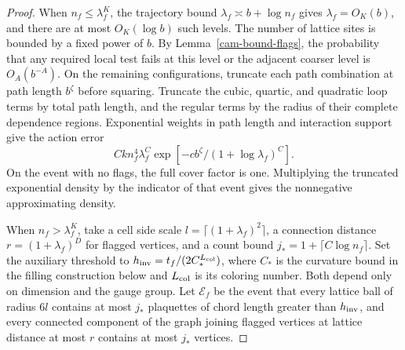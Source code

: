\documentclass[11pt,a4paper]{article}
\numberwithin{equation}{section}
\begin{document}
\begin{proof}
When \(n_f\le\lambda_f^K\), the trajectory bound \(\lambda_f\asymp b+\log n_f\) gives \(\lambda_f=O_K(b)\), and there are at most \(O_K(\log b)\) such levels. The number of lattice sites is bounded by a fixed power of \(b\). By Lemma~\ref{cam-bound-flags}, the probability that any required local test fails at this level or the adjacent coarser level is \(O_A(b^{-A})\). On the remaining configurations, truncate each path combination at path length \(b^\zeta\) before squaring. Truncate the cubic, quartic, and quadratic loop terms by total path length, and the regular terms by the radius of their complete dependence regions. Exponential weights in path length and interaction support give the action error \cite[Lemma 12.3 and Definition 5.2]{armstrong}
\[
 C k n_f^4\lambda_f^C\exp[-c b^\zeta/(1+\log\lambda_f)^C].
\]
On the event with no flags, the full cover factor is one. Multiplying the truncated exponential density by the indicator of that event gives the nonnegative approximating density.

When \(n_f>\lambda_f^K\), take a cell side scale \(l=\lceil(1+\lambda_f)^2\rceil\), a connection distance \(r=(1+\lambda_f)^D\) for flagged vertices, and a count bound \(j_*=1+\lceil C\log n_f\rceil\). Set the auxiliary threshold to \(h_{\rm inv}=t_f/(2C_*^{L_{\rm col}})\), where \(C_*\) is the curvature bound in the filling construction below and \(L_{\rm col}\) is its coloring number. Both depend only on dimension and the gauge group. Let \(\mathcal E_f\) be the event that every lattice ball of radius \(6l\) contains at most \(j_*\) plaquettes of chord length greater than \(h_{\rm inv}\), and every connected component of the graph joining flagged vertices at lattice distance at most \(r\) contains at most \(j_*\) vertices.


\end{proof}
\end{document}
